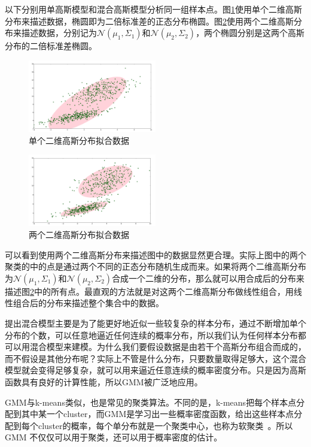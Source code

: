 \documentclass[UTF8]{ctexart}
\begin{document}
以下分别用单高斯模型和混合高斯模型分析同一组样本点。图\ref{SGM-model}使用单个二维高斯分布来描述数据，椭圆即为二倍标准差的正态分布椭圆。图\ref{GMM-model}使用两个二维高斯分布来描述数据，分别记为$\mathcal N({\mu}_1,{\Sigma}_1)$和$\mathcal N({\mu}_2,{\Sigma}_2)$，两个椭圆分别是这两个高斯分布的二倍标准差椭圆。
\begin{figure}[!h]
	\includegraphics[width=0.5\textwidth]{./figures/SGM.jpg}
	\centering
	\caption{单个二维高斯分布拟合数据}
	\label{SGM-model}
\end{figure}
\begin{figure}[!h]
	\includegraphics[width=0.5\textwidth]{./figures/GMM.jpg}
	\centering
	\caption{两个二维高斯分布拟合数据}
	\label{GMM-model}
\end{figure}

可以看到使用两个二维高斯分布来描述图中的数据显然更合理。实际上图中的两个聚类的中的点是通过两个不同的正态分布随机生成而来。如果将两个二维高斯分布为$\mathcal N({\mu}_1,{\Sigma}_1)$和$\mathcal N({\mu}_2,{\Sigma}_2)$合成一个二维的分布，那么就可以用合成后的分布来描述图\ref{GMM-model}中的所有点。最直观的方法就是对这两个二维高斯分布做线性组合，用线性组合后的分布来描述整个集合中的数据。

提出混合模型主要是为了能更好地近似一些较复杂的样本分布，通过不断增加单个分布的个数，可以任意地逼近任何连续的概率分布，所以我们认为任何样本分布都可以用混合模型来建模。为什么我们要假设数据是由若干个高斯分布组合而成的，而不假设是其他分布呢？实际上不管是什么分布，只要数量取得足够大，这个混合模型就会变得足够复杂，就可以用来逼近任意连续的概率密度分布。只是因为高斯函数具有良好的计算性能，所以GMM被广泛地应用。

GMM与k-means类似，也是常见的聚类算法。不同的是，k-means把每个样本点分配到其中某一个cluster，而GMM是学习出一些概率密度函数，给出这些样本点分配到每个cluster的概率，每个单分布就是一个聚类中心，也称为软聚类 。所以GMM 不仅仅可以用于聚类，还可以用于概率密度的估计。
\end{document}
